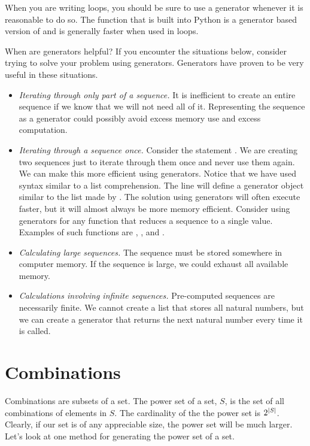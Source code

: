 When you are writing  loops, you should be sure to use a generator whenever it is reasonable to do so.
The  function that is built into Python is a generator based version of  and is generally faster when used in  loops.

When are generators helpful? If you encounter the situations below, consider trying to solve 
your problem using generators.  Generators have proven to be very useful in these situations.
\begin{itemize}
\item \emph{Iterating through only part of a sequence.}
It is inefficient to create an entire sequence if we know that we will not need all of it.
Representing the sequence as a generator could possibly avoid excess memory use and excess computation.
\item \emph{Iterating through a sequence once.} Consider the statement 
.
We are creating two sequences just to iterate through them once and never use them again.
We can make this more efficient using generators.
Notice that we have used syntax similar to a list comprehension.
The line  will define a generator object similar to the list made by \li{[i for i in xrange(1000) if i\%2 == 0]}.
The solution using generators will often execute faster, but it will almost always be more memory efficient.  Consider using generators for any function that reduces a sequence to a single value.  Examples of such functions are , , and .
\item \emph{Calculating large sequences.}  The sequence must be stored somewhere in computer memory.
If the sequence is large, we could exhaust all available memory.
\item \emph{Calculations involving infinite sequences.}  Pre-computed sequences are necessarily finite.  We cannot create a list that stores all natural numbers, but we can create a generator that returns the next natural number every time it is called.
\end{itemize}


\section*{Combinations}
Combinations are subsets of a set.  The power set of a set, $S$, is the set of all combinations
of elements in $S$.  The cardinality of the the power set is $2^{\left\lvert S\right\rvert}$.  Clearly, if our
set is of any appreciable size, the power set will be much larger.  Let's look at one method for
generating the power set of a set.

